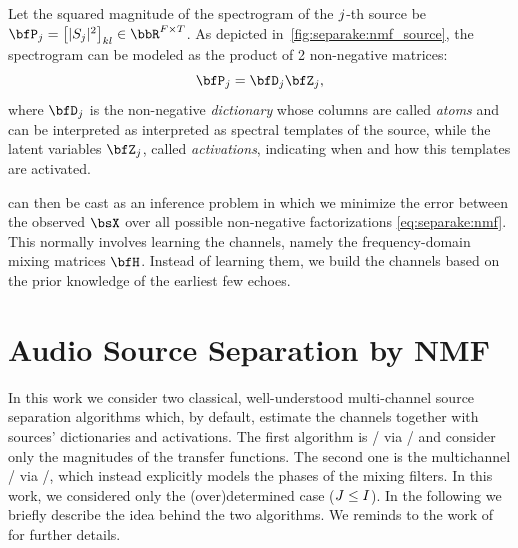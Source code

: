 \mynewline
Let the squared magnitude of the spectrogram of the $j$-th source be $\mP_\idxSrc = \klist{\powerOf{\SRC_\idxSrc}}_{kl} \in \bbR^{F\times T}$.
As depicted in~\cref{fig:separake:nmf_source}, the spectrogram can be modeled as the product of 2 non-negative matrices:
\begin{equation}
    \label{eq:separake:nmf}
    \mP_\idxSrc =  \mD_\idxSrc \mZ_\idxSrc,
\end{equation}
where $\mD_\idxSrc$ is the non-negative \textit{dictionary} whose columns are called \textit{atoms} and can be interpreted as interpreted as spectral templates of the source,
while the latent variables $\mZ_\idxSrc$, called \textit{activations}, indicating when and how this templates are activated.

 can then be cast as an inference problem in which we minimize the error between the observed $\MICS$ over all possible non-negative factorizations \eqref{eq:separake:nmf}.
This normally involves learning the channels, namely the frequency-domain mixing matrices $\FLTSS$.
Instead of learning them, we build the channels based on the prior knowledge of the earliest few echoes.

\section{Audio Source Separation by NMF}
In this work we consider two classical, well-understood multi-channel source separation algorithms which, by default, estimate the channels together with sources' dictionaries and activations.
The first algorithm is \NMFdef/ via \MUdef/ and consider only the magnitudes of the transfer functions.
The second one is the multichannel \NMF/ via \EMdef/, which instead explicitly models the phases of the mixing filters.
In this work, we considered only the (over)determined case ($J \leq I$).
In the following we briefly describe the idea behind the two algorithms.
We reminds to the work of~ for further details.

